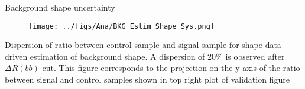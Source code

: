 \begin{frame}{Background shape uncertainty}
\vspace{-.2cm}
\begin{figure}[!Hhtbp]
  \begin{center}
    \texttt{[image: ../figs/Ana/BKG\_Estim\_Shape\_Sys.png]}
    \label{fig:ShapeSys}
  \end{center}
\end{figure}

\vspace{-.2cm}
    \begin{block}{}
      \tiny \centering Dispersion of ratio between control sample and signal sample for shape data-driven estimation of background shape. A dispersion of 20\% is observed after $\Delta R (bb)$ cut. This figure corresponds to the projection on the y-axis of the ratio between signal and control samples shown in top right plot of validation figure
    \end{block}

\end{frame}

